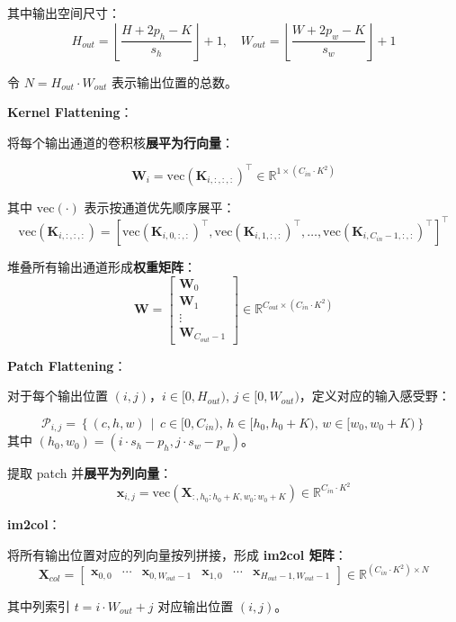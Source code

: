 其中输出空间尺寸： \[
H_{out} = \left\lfloor \frac{H + 2p_h - K}{s_h} \right\rfloor + 1,
\quad W_{out} = \left\lfloor \frac{W + 2p_w - K}{s_w} \right\rfloor + 1
\]

令 \(N = H_{out} \cdot W_{out}\) 表示输出位置的总数。

\textbf{Kernel Flattening}：

将每个输出通道的卷积核\textbf{展平为行向量}：

\[
\mathbf{W}_{i} = \text{vec}\left(\mathbf{K}_{i, :, :, :}\right)^\top \in \mathbb{R}^{1 \times (C_{in} \cdot K^2)}
\]

其中 \(\text{vec}(\cdot)\) 表示按通道优先顺序展平： \[
\text{vec}\left(\mathbf{K}_{i, :, :, :}\right)
= \left[ \text{vec}\left(\mathbf{K}_{i, 0, :, :}\right)^\top, \text{vec}\left(\mathbf{K}_{i, 1, :, :}\right)^\top,
\ldots, \text{vec}\left(\mathbf{K}_{i, C_{in}-1, :, :}\right)^\top \right]^\top
\]

堆叠所有输出通道形成\textbf{权重矩阵}： \[
\mathbf{W} = \begin{bmatrix} \mathbf{W}_0 \\ \mathbf{W}_1 \\ \vdots \\ \mathbf{W}_{C_{out}-1} \end{bmatrix}
\in \mathbb{R}^{C_{out} \times (C_{in} \cdot K^2)}
\]

\textbf{Patch Flattening}：

对于每个输出位置 \((i, j)\)，\(i \in [0, H_{out})\),
\(j \in [0, W_{out})\)，定义对应的输入感受野：

\[
\mathcal{P}_{i,j} = \left\{ (c, h, w) \,\middle|\, c \in [0, C_{in}),\, h \in [h_0, h_0+K),\, w \in [w_0, w_0+K) \right\}
\] 其中 \((h_0, w_0) = (i \cdot s_h - p_h, j \cdot s_w - p_w)\)。

提取 patch 并\textbf{展平为列向量}： \[
\mathbf{x}_{i,j} = \text{vec}\left(\mathbf{X}_{:, h_0:h_0+K, w_0:w_0+K}\right) \in \mathbb{R}^{C_{in} \cdot K^2}
\]

\textbf{im2col}：

将所有输出位置对应的列向量按列拼接，形成 \textbf{im2col 矩阵}： \[
\mathbf{X}_{col} =
\begin{bmatrix} \mathbf{x}_{0,0} & \cdots & \mathbf{x}_{0,W_{out}-1} & \mathbf{x}_{1,0} & \cdots
& \mathbf{x}_{H_{out}-1,W_{out}-1} \end{bmatrix} \in \mathbb{R}^{(C_{in} \cdot K^2) \times N}
\]

其中列索引 \(t = i \cdot W_{out} + j\) 对应输出位置 \((i, j)\)。

